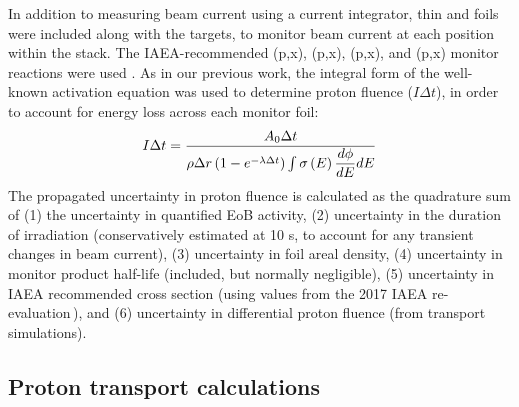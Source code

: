 In addition to 
measuring beam current  using  a current integrator, thin  and  foils were included along with the  targets, 
to monitor beam current at each position within the stack.
The IAEA-recommended (p,x), (p,x),  (p,x), and (p,x) monitor reactions were used 
\cite{Hermanne2018}.
As in our previous work, the integral form of the well-known activation equation was used to  determine proton fluence ($I \Delta t $),
in order to account for energy loss across each monitor foil:
\begin{equation}
I \Delta t = \dfrac{A_0 \Delta t}{\rho \Delta r \left( 1-e^{-\lambda \Delta t}\right) \int \sigma\left( E\right) \dfrac{d\phi}{dE} dE}
\end{equation}
The propagated uncertainty in proton fluence is calculated as the quadrature sum of (1) the uncertainty in quantified EoB activity, (2) uncertainty in the duration of irradiation (conservatively estimated at 10 s, to account for any transient changes in beam current), (3) uncertainty in foil areal density, (4) uncertainty in monitor product half-life (included, but normally negligible), (5) uncertainty in IAEA recommended cross section (using values  from the 2017 IAEA re-evaluation\,\cite{Hermanne2018}), and (6) uncertainty in differential proton fluence (from transport simulations).






\subsection{\label{sec:proton_transport_fe}Proton transport calculations}

